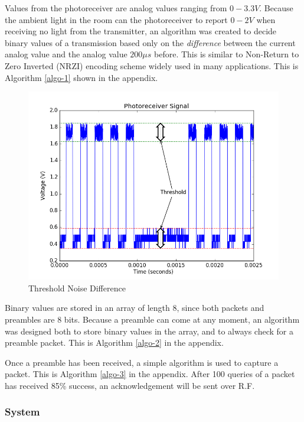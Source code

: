 \documentclass[letterpaper,10pt]{article}
\begin{document}
\begin{spacing}{1.15}
Values from the photoreceiver are analog values ranging from $0-3.3V$. Because the ambient light in the room can the photoreceiver to report $0-2V$ when receiving no light from the transmitter, an algorithm was created to decide binary values of a transmission based only on the \textit{difference} between the current analog value and the analog value $200 \mu s$ before. This is similar to Non-Return to Zero Inverted (NRZI) encoding scheme widely used in many applications. This is Algorithm \ref{algo-1} shown in the appendix. 

\begin{figure} [H]
	\centering
	\includegraphics[scale=0.45]{threshold.png}
	\caption{Threshold Noise Difference\label{fig:threshold}}
\end{figure}


Binary values are stored in an array of length 8, since both packets and preambles are 8 bits. Because a preamble can come at any moment, an algorithm was designed both to store binary values in the array, and to always check for a preamble packet. This is Algorithm \ref{algo-2} in the appendix.

Once a preamble has been received, a simple algorithm is used to capture a packet. This is Algorithm \ref{algo-3} in the appendix. After 100 queries of a packet has received 85\% success, an acknowledgement will be sent over R.F.

\makeatletter
\def\BState{\State\hskip-\ALG@thistlm}
\makeatother

\subsubsection{System}


\end{spacing}
\end{document}
